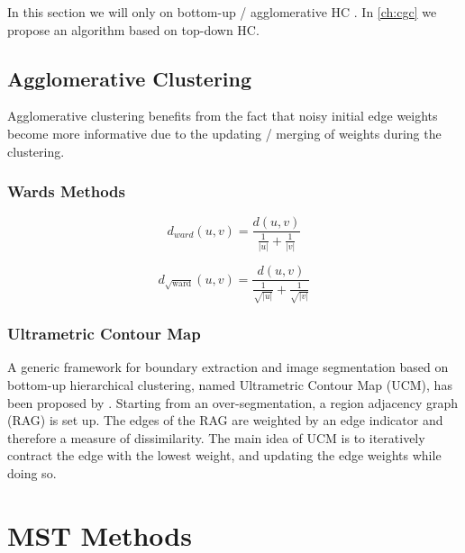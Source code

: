 In this section we will only on bottom-up / agglomerative HC . 
In \cref{ch:cgc}  we propose an algorithm  based on top-down HC.

\subsection{Agglomerative Clustering}\label{sec:hc_agglomerative_clustering}

Agglomerative clustering benefits from the fact that noisy initial edge weights
become more informative due to the updating / merging of weights during the clustering.


 \label{fig:hc_noise_reduction}


\subsubsection{Wards Methods}\label{sec:hc_wards_method}


\begin{equation} \label{eq:wards_method}
    d_{ward}(u,v) =  \frac{d(u,v)}{ \frac{1}{|u|} + \frac{1}{|v|} }
\end{equation}

\begin{equation} \label{eq:sqrt_wards_method}
    d_{\sqrt{\text{ward}}}(u,v) =  \frac{d(u,v)}{ \frac{1}{\sqrt{|u|}} + \frac{1}{\sqrt{|v|}} }
\end{equation}



\subsubsection{Ultrametric Contour Map}\label{sec:hc_ucm}

A generic framework for boundary extraction and image segmentation based
on bottom-up hierarchical clustering, named Ultrametric Contour Map (UCM), 
has been proposed by \citet{arbelaez_2006_cvpr} . 
Starting from an over-segmentation, a region adjacency graph (RAG) is set up.
The edges of the RAG are weighted by an edge indicator and therefore a measure  of dissimilarity.
The main idea of UCM is to iteratively contract the edge with the lowest weight, 
and updating the edge weights while doing so.

\section{MST Methods}\label{sec:rw_mst_methods}


